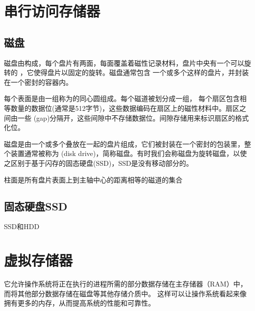\documentclass{template}
\begin{document}
\section{串行访问存储器}
    \subsection{磁盘}
        磁盘由构成，每个盘片有两面，每面覆盖着磁性记录材料，盘片中央有一个可以旋转的
        ，它使得盘片以固定的旋转。磁盘通常包含
        一个或多个这样的盘片，并封装在一个密封的容器内。

        每个表面是由一组称为的同心圆组成。每个磁道被划分成一组，
        每个扇区包含相等数量的数据位(通常是512字节)，这些数据编码在扇区上的磁性材料中。扇区之间由一些
        {(gap)}分隔开，这些间隙中不存储数据位。间隙存储用来标识扇区的格式化位。

        磁盘是由一个或多个叠放在一起的盘片组成，它们被封装在一个密封的包装里，整个装置通常被称为
        {(disk drive)}，简称磁盘。有时我们会称磁盘为旋转磁盘，以使之区别于基于闪存的固态硬盘(SSD)，SSD是没有移动部分的。

        柱面是所有盘片表面上到主轴中心的距离相等的磁道的集合

    \subsection{固态硬盘SSD}
        SSD和HDD




\section{虚拟存储器}
    它允许操作系统将正在执行的进程所需的部分数据存储在主存储器（RAM）中，而将其他部分数据存储在磁盘等其他存储介质中。
    这样可以让操作系统看起来像拥有更多的内存，从而提高系统的性能和可靠性。
\end{document}
